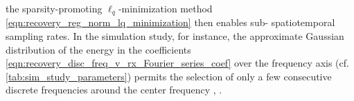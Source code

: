 the sparsity-promoting $\ell_{q}$-minimization method
\eqref{eqn:recovery_reg_norm_lq_minimization} then enables
sub- spatiotemporal sampling rates.
In
the simulation study, for instance,
the approximate Gaussian distribution of
the energy in
the  coefficients
\eqref{eqn:recovery_disc_freq_v_rx_Fourier_series_coef} over
the frequency axis
(cf. \cref{tab:sim_study_parameters}) permits
the selection of
only a few consecutive discrete frequencies around
the center frequency
\cite[Sect. III-B]{article:BurshteinITUFFC2016},
\cite[Sect. IV-B]{article:ChernyakovaITUFFC2014}.

